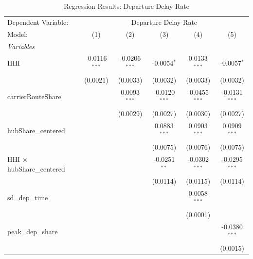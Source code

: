 \documentclass[preprint,12pt,authoryear]{elsarticle}
\begin{document}
\FloatBarrier
\begin{table}[htbp]
   \caption{\label{tab:Reg1} Regression Results: Departure Delay Rate}
   \centering
   \begin{tabular}{lccccc}
      \tabularnewline \midrule \midrule
      Dependent Variable: & \multicolumn{5}{c}{Departure Delay Rate}\\
      Model:                            & (1)             & (2)             & (3)             & (4)             & (5)\\  
      \midrule
      \emph{Variables}\\
      HHI                               & -0.0116$^{***}$ & -0.0206$^{***}$ & -0.0054$^{*}$   & 0.0133$^{***}$  & -0.0057$^{*}$\\   
                                        & (0.0021)        & (0.0033)        & (0.0032)        & (0.0033)        & (0.0032)\\   
      carrierRouteShare                 &                 & 0.0093$^{***}$  & -0.0120$^{***}$ & -0.0455$^{***}$ & -0.0131$^{***}$\\   
                                        &                 & (0.0029)        & (0.0027)        & (0.0030)        & (0.0027)\\   
      hubShare\_centered                &                 &                 & 0.0883$^{***}$  & 0.0903$^{***}$  & 0.0909$^{***}$\\   
                                        &                 &                 & (0.0075)        & (0.0076)        & (0.0075)\\   
      HHI $\times$ hubShare\_centered   &                 &                 & -0.0251$^{**}$  & -0.0302$^{***}$ & -0.0295$^{***}$\\   
                                        &                 &                 & (0.0114)        & (0.0115)        & (0.0114)\\   
      sd\_dep\_time                     &                 &                 &                 & 0.0058$^{***}$  &   \\   
                                        &                 &                 &                 & (0.0001)        &   \\   
      peak\_dep\_share                  &                 &                 &                 &                 & -0.0380$^{***}$\\   
                                        &                 &                 &                 &                 & (0.0015)\\   

\end{tabular}
\end{table}
\end{document}
